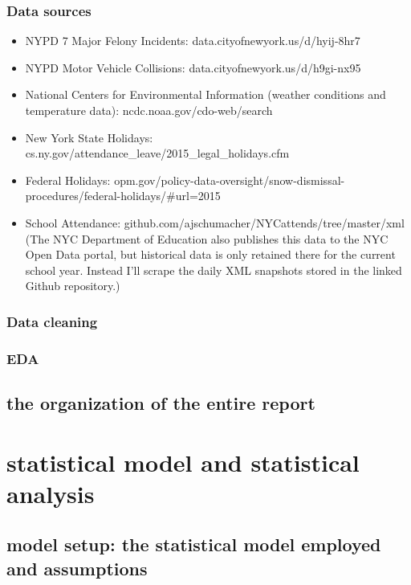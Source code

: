 \documentclass[12pt,notitlepage]{article}
\begin{document}
\subsubsection{Data sources}

\begin{itemize}
\item NYPD 7 Major Felony Incidents: data.cityofnewyork.us/d/hyij-8hr7
\item NYPD Motor Vehicle Collisions: data.cityofnewyork.us/d/h9gi-nx95
\item National Centers for Environmental Information (weather conditions and temperature data): ncdc.noaa.gov/cdo-web/search
\item New York State Holidays: cs.ny.gov/attendance\_leave/2015\_legal\_holidays.cfm
\item Federal Holidays: opm.gov/policy-data-oversight/snow-dismissal-procedures/federal-holidays/\#url=2015
\item School Attendance: github.com/ajschumacher/NYCattends/tree/master/xml
(The NYC Department of Education also publishes this data to the NYC Open Data portal, but historical data is only retained there for the current school year. Instead I’ll scrape the daily XML snapshots stored in the linked Github repository.)
\end{itemize}

\subsubsection{Data cleaning}


\subsubsection{EDA}


\subsection{the organization of the entire report}






\section{statistical model and statistical analysis}


\subsection{model setup: the statistical model employed and assumptions}
\end{document}
